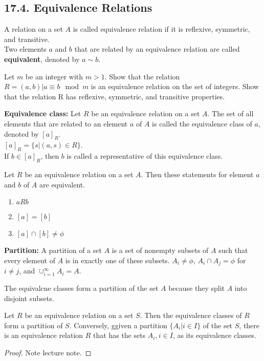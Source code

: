 \subsection*{17.4. Equivalence Relations}

\begin{definition}
    A relation on a set $A$ is called equivalence relation if it is reflexive, symmetric, and transitive. \\
    Two elements $a$ and $b$ that are related by an equivalence relation are called \textbf{equivalent}, denoted by $a \sim b$.
\end{definition}
\begin{example}
    Let $m$ be an integer with $m > 1$. Show that the relation $R = {(a, b) | a \equiv b \mod m}$ is an equivalence relation on the set of integers. Show that the relation R has reflexive, symmetric, and transitive properties.
\end{example}

\begin{definition}
    \textbf{Equivalence class: } Let $R$ be an equivalence relation on a set $A$. The set of all elements that are related to an element $a$ of $A$ is called the equivalence class of $a$, denoted by $[a]_R$. \\
    $[a]_R = \{s|(a, s) \in R\}$. \\
    If $b \in [a]_R$, then $b$ is called a representative of this equivalence class.
\end{definition}

\begin{theorem}
    Let $R$ be an equivalence relation on a set $A$. Then these statements for element $a$ and $b$ of $A$ are equivalent.
    \begin{enumerate}
        \item $aRb$
        \item $[a] = [b]$
        \item $[a] \cap [b] \neq \phi$
    \end{enumerate}
\end{theorem}

\begin{definition}
    \textbf{Partition: } A partition of a set $A$ is a set of nonempty subsets of $A$ such that every element of $A$ is in exactly one of these subsets. $A_i \neq \phi$, $A_i \cap A_j = \phi$ for $i \neq j$, and $\cup_{i=1}^{\infty} A_i = A$.
\end{definition}

The equivalcne classes form a partition of the set $A$ because they split $A$ into disjoint subsets.

\begin{theorem}
    Let $R$ be an equivalence relation on a set $S$. Then the equivalence classes of $R$ form a partition of $S$. Conversely, ggiven a partition $\{A_i | i \in I \}$ of the set $S$, there is an equivalence relation $R$ that has the sets $A_i, i \in I$, as its equivalence classes.
\end{theorem}
\begin{proof}
    Note lecture note.
\end{proof}